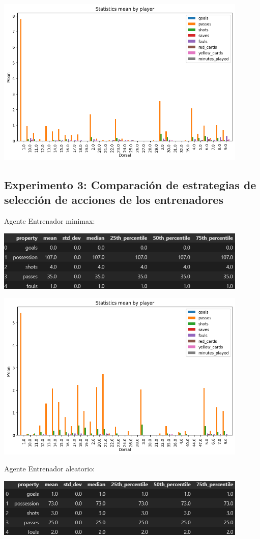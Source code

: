 \documentclass{article}
\begin{document}
\includegraphics[width=0.9\textwidth,height=0.5\textwidth]{smart_vs_random_line_up_away.png}                       

\subsection{Experimento 3: Comparación de estrategias de selección de acciones de los entrenadores}
Agente Entrenador minimax:

\includegraphics[width=0.9\textwidth]{tabla5.PNG}

\includegraphics[width=0.9\textwidth,height=0.5\textwidth]{smart_vs_random_line_up_home.png}

Agente Entrenador aleatorio:

\includegraphics[width=0.9\textwidth]{tabla6.PNG}
\end{document}
